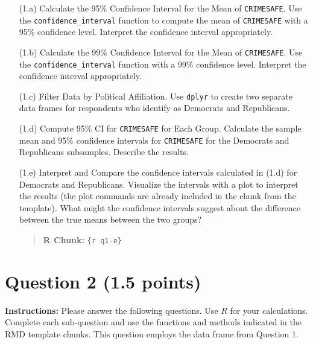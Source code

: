 \documentclass[11pt]{article}
\begin{document}
\begin{itemize}
    \item[(1.a)] Calculate the 95\% Confidence Interval for the Mean of \texttt{CRIMESAFE}. Use the \texttt{confidence\_interval} function to compute the mean of \texttt{CRIMESAFE} with a 95\% confidence level. Interpret the confidence interval appropriately.

    \item[(1.b)] Calculate the 99\% Confidence Interval for the Mean of \texttt{CRIMESAFE}. Use the \texttt{confidence\_interval} function with a 99\% confidence level. Interpret the confidence interval appropriately.

    \item[(1.c)] Filter Data by Political Affiliation. Use \texttt{dplyr} to create two separate data frames for respondents who identify as Democrats and Republicans.

    \item[(1.d)] Compute 95\% CI for \texttt{CRIMESAFE} for Each Group. Calculate the sample mean and 95\% confidence intervals for \texttt{CRIMESAFE} for the Democrats and Republicans subsamples. Describe the results.

    \item[(1.e)] Interpret and Compare the confidence intervals calculated in (1.d) for Democrats and Republicans.  Visualize the intervals with a plot to interpret the results (the plot commands are already included in the chunk from the template). What might the confidence intervals suggest about the difference between the true means between the two groups?
    \begin{quote}
    \textbf{R Chunk:} \texttt{\{r q1-e\}}
    \end{quote}
\end{itemize}

\newpage
\section*{Question 2 (1.5 points)}

\textbf{Instructions:} Please answer the following questions. Use $R$ for your calculations. Complete each sub-question and use the functions and methods indicated in the RMD template chunks. This question employs the data frame from Question 1.
\end{document}
